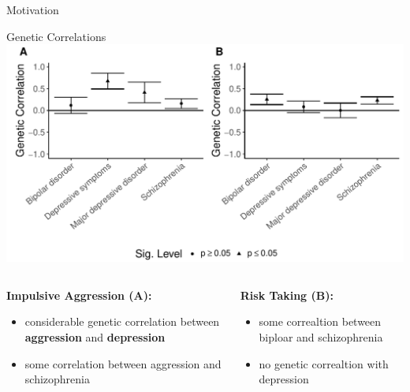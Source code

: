 \documentclass{beamer}
\begin{document}
  \begin{frame}[t]{Motivation}
    
  \end{frame}

  \begin{frame}[t]{Genetic Correlations}
  \includegraphics[width=0.8\linewidth]{../ukb_psychiatric/figures/combined_corr.pdf}
  \begin{columns}[T]
    \tiny
    \begin{column}[T]{0.5\textwidth}
      \textbf{Impulsive Aggression (A):}\\
      \begin{itemize}
        \item considerable genetic correlation between \textbf{aggression} and \textbf{depression}
        \item some correlation between aggression and schizophrenia
      \end{itemize}
    \end{column}
    \begin{column}[T]{0.5\textwidth}
      \textbf{Risk Taking (B):}\\
      \begin{itemize}
        \item some correaltion between biploar and schizophrenia
        \item no genetic correaltion with depression
      \end{itemize}
    \end{column}
  \end{columns}
  \end{frame}
\end{document}
